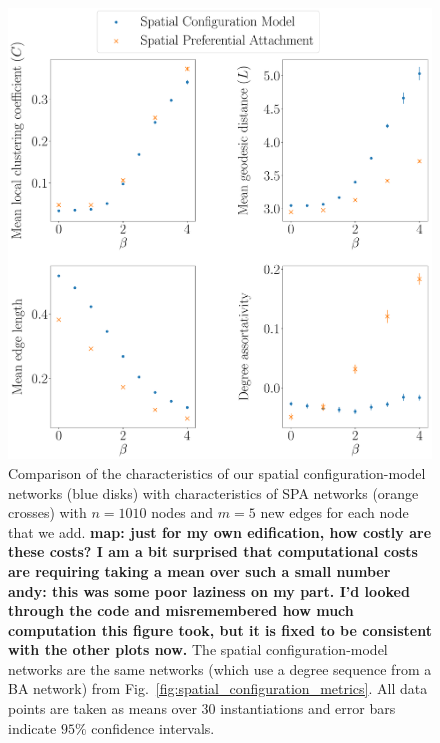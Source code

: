\documentclass[%
 reprint,
 amsmath,amssymb,
 aps,
]{revtex4-1}
\begin{document}
\begin{figure}
    \centering
    \includegraphics[width=1.0\linewidth]{spatial_preferential_comparison.pdf}
    \caption{Comparison of the characteristics of our spatial configuration-model networks (blue disks) with characteristics of SPA networks (orange crosses) with $n = 1010$ nodes and $m = 5$ new edges for each node that we add.
{\bf map: just for my own edification, how costly are these costs? I am a bit surprised that computational costs are requiring taking a mean over such a small number}
{\bf andy: this was some poor laziness on my part. I'd looked through the code and misremembered how much computation this figure took, but it is fixed to be consistent with the other plots now.}
     The spatial configuration-model networks are the same networks (which use a degree sequence from a BA network) from Fig.~\ref{fig:spatial_configuration_metrics}. {\color{red}All data points are taken as means over 30 instantiations and error bars indicate $95\%$ confidence intervals.} 
}
    \label{fig:spatial_preferential_comparison}
\end{figure}
 
\end{document}
